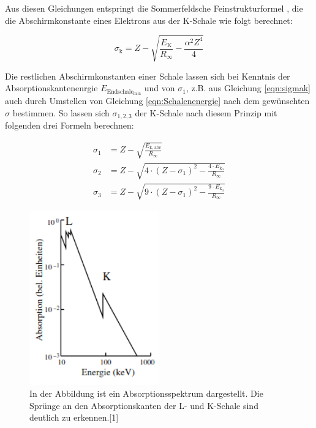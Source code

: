 \documentclass[titlepage = firstcover]{scrartcl}
\begin{document}
            \noindent
            Aus diesen Gleichungen entspringt die Sommerfeldsche Feinstrukturformel , die die Abschirmkonstante eines Elektrons aus der K-Schale wie folgt berechnet:

            \begin{equation}
              \sigma_{\text{k}} = Z - \sqrt{\frac{E_{\text{K}}}{R_{\infty}} - \frac{\alpha ^2 Z^4}{4}}
              \label{eqn:sigmak}
            \end{equation}
            
            \noindent
            Die  restlichen Abschirmkonstanten einer Schale lassen sich bei Kenntnis der Absorptionskantenenrgie $E_{\text{Endschale}_{\text{m-n}}}$ und von $\sigma_1$, z.B. aus Gleichung 
            \ref{eqn:sigmak} auch durch Umstellen von Gleichung \ref{eqn:Schalenenergie} nach dem gewünschten $\sigma$ bestimmen. So lassen sich $\sigma_{1,2,3}$ der K-Schale nach diesem
            Prinzip mit folgenden drei Formeln berechnen:
            
            \begin{align}
              \sigma_1 &= Z - \sqrt{\frac{E_{\text{k, abs}}}{R_{\infty}}} \\
              \sigma_2 &= Z - \sqrt{4 \cdot \left(Z - \sigma_1\right)^2 - \frac{4 \cdot E_{\text{k}_{\alpha}}}{R_{\infty}}} \\
              \sigma_3 &= Z - \sqrt{9 \cdot \left(Z - \sigma_1\right)^2 - \frac{9 \cdot E_{\text{k}_{\beta}}}{R_{\infty}}} 
              \label{eqn:Cusigmas}
            \end{align}
            \noindent

            \FloatBarrier

            \begin{figure}[h]
              \centering
              \includegraphics[width = 0.5\textwidth]{Kanten.png}
              \caption{In der Abbildung ist ein Absorptionsspektrum dargestellt. Die Sprünge an den Absorptionskanten der L- und K-Schale sind deutlich zu erkennen.[1]}
              \label{fig:SkizzeBragg}
            \end{figure}
\end{document}
